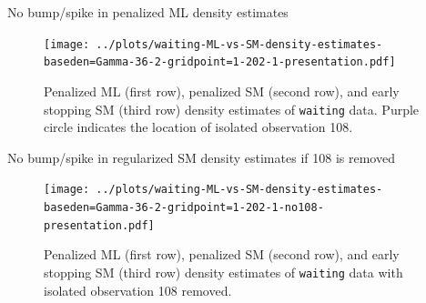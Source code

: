 \documentclass[aspectratio=169,xcolor=dvipsnames]{beamer}
\begin{document}
\begin{frame}{No bump/spike in penalized ML density estimates}
	
	\begin{figure}
		\centering
		\texttt{[image: ../plots/waiting-ML-vs-SM-density-estimates-baseden=Gamma-36-2-gridpoint=1-202-1-presentation.pdf]}
		\caption{Penalized ML (first row), penalized SM (second row), and early stopping SM (third row) density estimates of \texttt{waiting} data. Purple circle indicates the location of isolated observation 108.}
		\label{fig-sm-ml-compare-with108}
	\end{figure}

\end{frame}


%	
%	


\begin{frame}{No bump/spike in regularized SM density estimates if 108 is removed}
	
	\begin{figure}
		\centering
		\texttt{[image: ../plots/waiting-ML-vs-SM-density-estimates-baseden=Gamma-36-2-gridpoint=1-202-1-no108-presentation.pdf]}
		\caption{Penalized ML (first row), penalized SM (second row), and early stopping SM (third row) density estimates of \texttt{waiting} data with isolated observation 108 removed.}
		\label{fig-sm-ml-compare-no108}
	\end{figure}

\end{frame}
\end{document}

